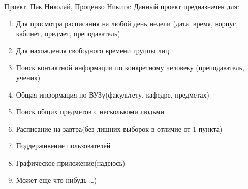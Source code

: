 \documentclass{article}
\begin{document}
\LARGE
Проект. Пак Николай, Проценко Никита:
Данный проект предназначен для: \\
\begin{enumerate}
	\item Для просмотра расписания на любой день недели (дата, время, корпус, кабинет, предмет, преподаватель)
	\item Для нахождения свободного времени группы лиц
	\item Поиск контактной информации по конкретному человеку (преподаватель, ученик)
	\item Общая информация по ВУЗу(факультету, кафедре, предметах)
	\item Поиск общих предметов с несколькоми людьми
	\item Расписание на завтра(без лишних выборок в отличие от 1 пункта)
	\item Поддерживение пользователей
	\item Графическое приложение(надеюсь)
	\item Может еще что нибудь \ldots )
\end{enumerate}
	
\end{document}
